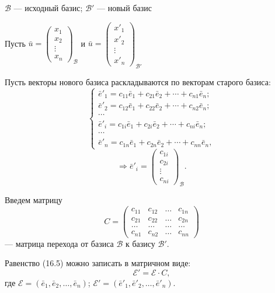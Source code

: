 \documentclass[12pt,a4paper]{article}
\newcommand{\vu}{\bar u}
\newcommand{\ve}{\bar e}
\begin{document}
$\mathcal{B}$ --- исходный базис; $\mathcal{B}'$ --- новый базис

Пусть $\vu =
\begin{pmatrix} x_1 \\ x_2 \\ \vdots \\ x_n
\end{pmatrix}_{\mathcal{B}}$ и $\vu =
\begin{pmatrix} x'_1 \\ x'_2 \\ \vdots \\ x'_n
\end{pmatrix}_{\mathcal{B}'}$

Пусть векторы нового базиса раскладываются по векторам старого базиса:
\begin{equation}
\begin{cases}
\ve'_1 = c_{11} \ve_1 + c_{21} \ve_2 + \cdots + c_{n1} \ve_n;\\
\ve'_2 = c_{12} \ve_1 + c_{22} \ve_2 + \cdots + c_{n2} \ve_n;\\
\cdots\\
\ve'_i = c_{1i} \ve_1 + c_{2i} \ve_2 + \cdots + c_{ni} \ve_n;\\
\cdots\\
\ve'_n = c_{1n} \ve_1 + c_{2n} \ve_2 + \cdots + c_{nn} \ve_n,
\end{cases}
\tag{16.5}
\end{equation}
$$
\Rightarrow \ve'_i =
\begin{pmatrix} c_{1i} \\ c_{2i} \\ \vdots \\ c_{ni}
\end{pmatrix}_{\mathcal{B}}.
$$

Введем матрицу
$$
C =
\begin{pmatrix} c_{11} & c_{12} & \ldots & c_{1n} \\ c_{21} & c_{22}
& \ldots & c_{2n} \\ \ldots & \ldots & \ldots & \ldots \\ c_{n1} &
c_{n2} & \ldots & c_{nn}
\end{pmatrix}
$$
--- матрица перехода от базиса $\mathcal{B}$ к базису $\mathcal{B}'$.

Равенство (16.5) можно записать в матричном виде:
\begin{equation}
\mathcal{E}' = \mathcal{E} \cdot C, \tag{16.6}
\end{equation}
где $\mathcal{E} = (\ve_1, \ve_2, \ldots, \ve_n)$; $\mathcal{E}' =
(\ve'_1, \ve'_2, \ldots, \ve'_n)$.
\end{document}
